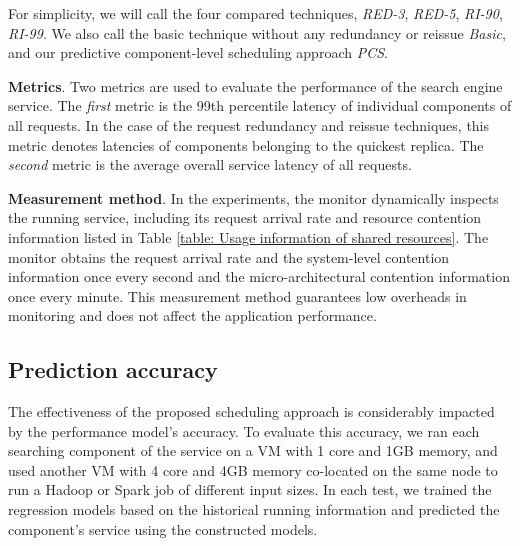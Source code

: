\documentclass[10pt, conference, compsocconf]{IEEEtran}
\begin{document}
For simplicity, we will call the four compared techniques, \emph{RED-3}, \emph{RED-5}, \emph{RI-90}, \emph{RI-99}. We also call the basic technique without any redundancy or reissue \emph{Basic}, and our predictive component-level scheduling approach \emph{PCS}.

\textbf{Metrics}. Two metrics are used to evaluate the performance of the search engine service. The \emph{first} metric is the 99th percentile latency of individual components of all requests. In the case of the request redundancy and reissue techniques, this metric denotes latencies of components belonging to the quickest replica. The \emph{second} metric is the average overall service latency of all requests.



\textbf{Measurement method}. In the experiments, the monitor dynamically inspects the running service, including its request arrival rate and resource contention information listed in Table \ref{table: Usage information of shared resources}. The monitor obtains the request arrival rate and the system-level contention information once every second and the micro-architectural contention information once every minute. This measurement method guarantees low overheads in monitoring and does not affect the application performance.





\subsection{Prediction accuracy} \label{Section: Prediction accuracy}
The effectiveness of the proposed scheduling approach is considerably impacted by the performance model's accuracy. To evaluate this accuracy, we ran each searching component of the service on a VM with 1 core and 1GB memory, and used another VM with 4 core and 4GB memory co-located on the same node to run a Hadoop or Spark job of different input sizes. In each test, we trained the regression models based on the historical running information and predicted the component's service using the constructed models.
\end{document}
